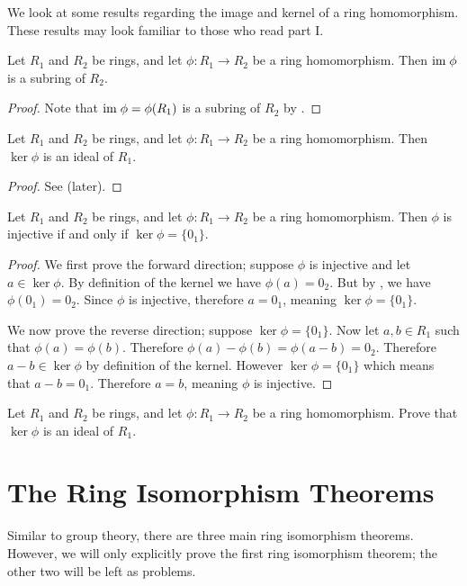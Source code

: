We look at some results regarding the image and kernel of a ring homomorphism. These results may look familiar to those who read part I.
\begin{proposition}\label{prop-image-is-a-subring}
    Let $R_1$ and $R_2$ be rings, and let $\phi: R_1 \to R_2$ be a ring homomorphism. Then $\mathrm{im}\;\phi$ is a subring of $R_2$.
\end{proposition}
\begin{proof}
    Note that $\mathrm{im}\;\phi = \phi(R_1)$ is a subring of $R_2$ by .
\end{proof}

\begin{proposition}\label{prop-kernel-is-an-ideal}
    Let $R_1$ and $R_2$ be rings, and let $\phi: R_1 \to R_2$ be a ring homomorphism. Then $\ker\phi$ is an ideal of $R_1$.
\end{proposition}
\begin{proof}
    See  (later).
\end{proof}

\begin{proposition}
    Let $R_1$ and $R_2$ be rings, and let $\phi: R_1 \to R_2$ be a ring homomorphism. Then $\phi$ is injective if and only if $\ker\phi = \{0_1\}$.
\end{proposition}
\begin{proof}
    We first prove the forward direction; suppose $\phi$ is injective and let $a \in \ker\phi$. By definition of the kernel we have $\phi(a) = 0_2$. But by , we have $\phi(0_1) = 0_2$. Since $\phi$ is injective, therefore $a = 0_1$, meaning $\ker\phi = \{0_1\}$.

    We now prove the reverse direction; suppose $\ker\phi = \{0_1\}$. Now let $a,b \in R_1$ such that $\phi(a) = \phi(b)$. Therefore $\phi(a) - \phi(b) = \phi(a-b) = 0_2$. Therefore $a-b \in \ker\phi$ by definition of the kernel. However $\ker\phi = \{0_1\}$ which means that $a - b = 0_1$. Therefore $a = b$, meaning $\phi$ is injective.
\end{proof}

\begin{exercise}\label{exercise-kernel-is-an-ideal}
    Let $R_1$ and $R_2$ be rings, and let $\phi: R_1 \to R_2$ be a ring homomorphism. Prove that $\ker\phi$ is an ideal of $R_1$.
\end{exercise}

\section{The Ring Isomorphism Theorems}
Similar to group theory, there are three main ring isomorphism theorems. However, we will only explicitly prove the first ring isomorphism theorem; the other two will be left as problems.


